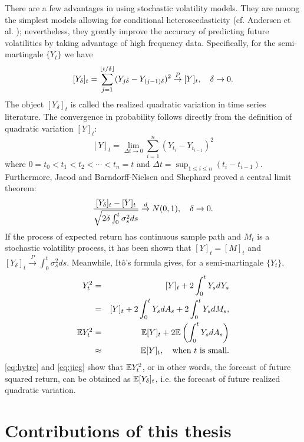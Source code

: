 There are a few advantages in using stochastic volatility models.
They are among the simplest models allowing for conditional
heteroscedasticity (cf. Andersen et al.
\cite{andersen:davis:kreiss:mikosch:2009}); nevertheless,
they greatly improve the accuracy of predicting future volatilities
by taking advantage of high frequency data. Specifically, for the
semi-martingale $\{Y_t\}$ we have
\begin{equation}
  \label{eq:jieg}
  [Y_{\delta}]_t
  =
  \sum_{j=1}^{\lfloor t/\delta\rfloor}
  (Y_{j \delta} - Y_{(j-1)\delta})^2
  \overset{P}{\to} [Y]_t,
  \quad
  \delta \to 0.
\end{equation}
The object $[Y_\delta]_t$ is called the realized quadratic variation
in time series literature.
The convergence in probability follows directly from the definition of
quadratic variation $[Y]_t$:
\[
[Y]_t = \lim_{\Delta t \to 0} \sum_{i=1}^{n} (Y_{t_i} - Y_{t_{i-1}})^2
\]
where $0 = t_0 < t_1 < t_2 < \cdots < t_n = t$ and
$\Delta t = \sup_{1\leq i \leq n} (t_i - t_{i-1})$.
Furthermore, Jacod \cite{jacod:1994} and
Barndorff-Nielsen and Shephard \cite{barndorff:shephard:2002} proved a
central limit theorem:
\[
  {[Y_\delta]_t - [Y]_t \over \sqrt{2 \delta \int_0^t \sigma_s^2 ds}}
  \overset{d}{\to} N(0, 1),
  \quad \delta \to 0.
\]
If the process of expected return has continuous sample path and $M_t$
is a stochastic volatility process, it has been shown that
$[Y]_t = [M]_t$ and
$[Y_\delta]_t \overset{P}{\to} \int_0^t \sigma_s^2 ds$.
Meanwhile, It\^o's formula gives, for a semi-martingale $\{Y_t\}$,
\begin{eqnarray}
  Y_t^2 &=& [Y]_t + 2 \int_0^t Y_s d Y_s \nonumber \\
  &=& [Y]_t + 2 \int_0^t Y_s dA_s + 2 \int_0^t Y_s dM_s, \nonumber \\
  \mathbb{E} Y_t^2 &=& \mathbb{E} [Y]_t + 2 \mathbb{E} \left( \int_0^t Y_s dA_s \right) \nonumber\\
  &\approx& \mathbb{E} [Y]_t, \quad \text{when $t$ is small}. \label{eq:hytre}
\end{eqnarray}
\eqref{eq:hytre} and \eqref{eq:jieg} show that $\mathbb{E} Y_t^2$, or in other
words, the forecast of future squared return, can be obtained as
$\mathbb{E} [Y_\delta]_t$, i.e. the forecast of future realized quadratic
variation.


\section{Contributions of this thesis}\label{sec:contr}


